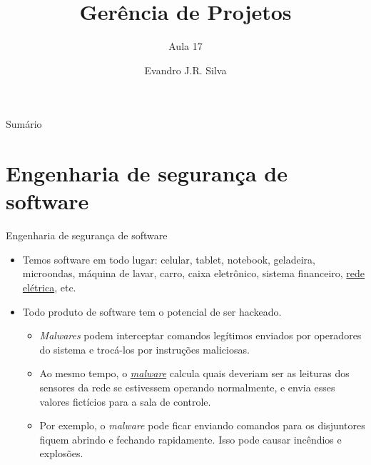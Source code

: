 \documentclass{beamer}
\title[GP 17]{Gerência de Projetos}
\subtitle{Aula 17}
\author[E.J.R. Silva]{Evandro J.R. Silva}
\date{}
\begin{document}
    
\begin{frame}
    \titlepage
\end{frame}

\begin{frame}{Sumário}
    \tableofcontents
\end{frame}


\section{Engenharia de segurança de software}

\begin{frame}{Engenharia de segurança de software}
	\begin{itemize}
		\justifying
		\item Temos software em todo lugar: celular, tablet, notebook, geladeira, microondas, máquina de lavar, carro, caixa eletrônico, sistema financeiro, \href{https://theconversation.com/hacking-the-grid-how-digital-sabotage-turns-infrastructure-into-a-weapon-272874}{rede elétrica}, etc.
		\item Todo produto de software tem o potencial de ser hackeado.
			\begin{itemize}
				\justifying
				\item<2> \textit{Malwares} podem interceptar comandos legítimos enviados por operadores do sistema e trocá-los por instruções maliciosas.
				\item<2> Ao mesmo tempo, o \href{https://www.ndss-symposium.org/ndss2017/ndss-2017-programme/hey-my-malware-knows-physics-attacking-plcs-physical-model-aware-rootkit/}{\textit{malware}} calcula quais deveriam ser as leituras dos sensores da rede se estivessem operando normalmente, e envia esses valores fictícios para a sala de controle.
				\item<3> Por exemplo, o \textit{malware} pode ficar enviando comandos para os disjuntores fiquem abrindo e fechando rapidamente. Isso pode causar incêndios e explosões.
			\end{itemize}
	\end{itemize}
\end{frame}
\end{document}
